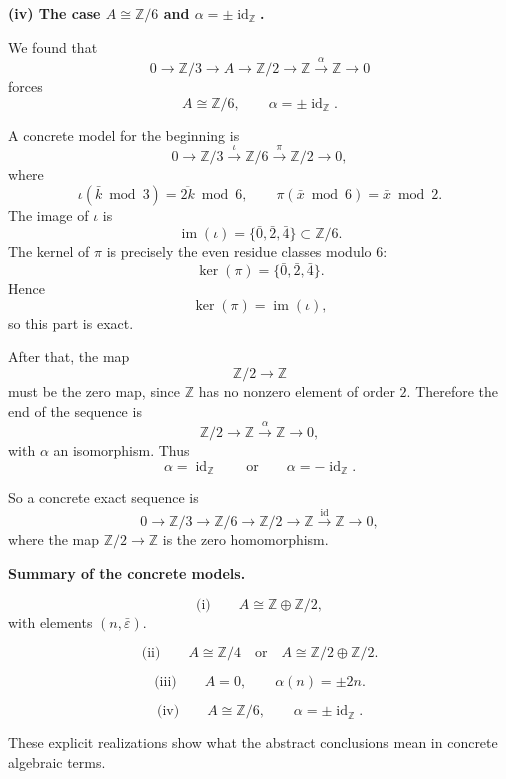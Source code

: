 \documentclass[12pt,a4paper]{article}
\theoremstyle{notespace}
\begin{document}
\medskip

\textbf{(iv) The case \(A\cong \mathbb Z/6\) and \(\alpha=\pm\operatorname{id}_{\mathbb Z}\).}

We found that
\[
0\longrightarrow \mathbb Z/3 \longrightarrow A \longrightarrow \mathbb Z/2
\longrightarrow \mathbb Z \xrightarrow{\alpha} \mathbb Z \longrightarrow 0
\]
forces
\[
A\cong \mathbb Z/6,
\qquad
\alpha=\pm\operatorname{id}_{\mathbb Z}.
\]

A concrete model for the beginning is
\[
0\longrightarrow \mathbb Z/3
\xrightarrow{\ \iota\ }
\mathbb Z/6
\xrightarrow{\ \pi\ }
\mathbb Z/2
\longrightarrow 0,
\]
where
\[
\iota(\bar k \bmod 3)=\overline{2k}\bmod 6,
\qquad
\pi(\bar x \bmod 6)=\bar x \bmod 2.
\]
The image of \(\iota\) is
\[
\operatorname{im}(\iota)=\{\bar0,\bar2,\bar4\}\subset \mathbb Z/6.
\]
The kernel of \(\pi\) is precisely the even residue classes modulo \(6\):
\[
\ker(\pi)=\{\bar0,\bar2,\bar4\}.
\]
Hence
\[
\ker(\pi)=\operatorname{im}(\iota),
\]
so this part is exact.

After that, the map
\[
\mathbb Z/2\longrightarrow \mathbb Z
\]
must be the zero map, since \(\mathbb Z\) has no nonzero element of order \(2\). Therefore the end of the sequence is
\[
\mathbb Z/2 \longrightarrow \mathbb Z
\xrightarrow{\ \alpha\ }
\mathbb Z \longrightarrow 0,
\]
with \(\alpha\) an isomorphism. Thus
\[
\alpha=\operatorname{id}_{\mathbb Z}
\qquad\text{or}\qquad
\alpha=-\operatorname{id}_{\mathbb Z}.
\]

So a concrete exact sequence is
\[
0\longrightarrow \mathbb Z/3
\longrightarrow \mathbb Z/6
\longrightarrow \mathbb Z/2
\longrightarrow \mathbb Z
\xrightarrow{\ \operatorname{id}\ }
\mathbb Z
\longrightarrow 0,
\]
where the map \(\mathbb Z/2\to \mathbb Z\) is the zero homomorphism.

\medskip

\textbf{Summary of the concrete models.}

\[
\text{(i)}\qquad A\cong \mathbb Z\oplus \mathbb Z/2,
\]
with elements \((n,\bar\varepsilon)\).

\[
\text{(ii)}\qquad A\cong \mathbb Z/4
\quad\text{or}\quad
A\cong \mathbb Z/2\oplus \mathbb Z/2.
\]

\[
\text{(iii)}\qquad A=0,\qquad \alpha(n)=\pm 2n.
\]

\[
\text{(iv)}\qquad A\cong \mathbb Z/6,\qquad \alpha=\pm \operatorname{id}_{\mathbb Z}.
\]

These explicit realizations show what the abstract conclusions mean in concrete algebraic terms.
\end{document}
